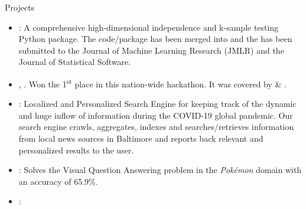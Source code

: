 \documentclass[]{mcdowellcv}
\begin{document}
	\begin{cvsection}{Projects}
		\begin{cvsubsection}{}{}{}
			\begin{itemize}
				\item \textbf{\href{https://github.com/neurodata/mgcpy}{}}: A comprehensive high-dimensional independence and k-sample testing Python package. The code/package has been merged into \href{https://github.com/scipy/scipy/pull/10524}{} and the \href{https://arxiv.org/abs/1907.02088}{} has been submitted to the Journal of Machine Learning Research (JMLR) and the Journal of Statistical Software.
				\item \textbf{\href{https://www.youtube.com/watch?v=iWw4_Ub2lPw&feature=youtu.be}{}}, \href{https://www.facebook.com/gtuoffice/videos/1786668221397028/?t=8798}{{}}. Won the 1\textsuperscript{st} place in this nation-wide hackathon.
				It was covered by \href{https://www.thehindu.com/todays-paper/tp-national/tp-tamilnadu/5-teams-from-ssn-college-win-prizes/article23461319.ece}{{}} \& \href{https://timesofindia.indiatimes.com/city/ahmedabad/six-winners-emerge-from-smart-india-hackathon/articleshow/63561717.cms?utm_source=whatsapp&utm_medium=social&utm_campaign=TOIMobile}{{}}.
				\item \textbf{\href{https://github.com/tpsatish95/covid19-search-engine}{}}: Localized and Personalized Search Engine for keeping track of the dynamic and huge inflow of information during the COVID-19 global pandemic.  Our search engine crawls, aggregates, indexes and searches/retrieves information from local news sources in Baltimore and reports back relevant and personalized results to the user.
				\item \href{https://github.com/tpsatish95/pokemon-vqa}{}: Solves the Visual Question Answering problem in the \textit{Pokémon} domain with an accuracy of 65.9\%.
				\item \textbf{\href{https://www.youtube.com/watch?v=O-L_uSHqQvQ}{}}:

\end{itemize}
\end{cvsubsection}
\end{cvsection}
\end{document}
